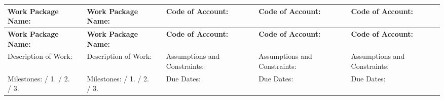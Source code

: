 \documentclass[10pt,letterpaper]{article}
\renewcommand\arraystretch{1.25}
\begin{document}
\begin{landscape}
\begin{center}
\begingroup
\setlength\tabcolsep{2.0pt}
\tiny
\renewcommand\arraystretch{1.55}
\begin{longtable}{|>{\raggedright\arraybackslash}p{0.795in}|>{\raggedright\arraybackslash}p{0.795in}|>{\raggedright\arraybackslash}p{0.795in}|>{\raggedright\arraybackslash}p{0.795in}|>{\raggedright\arraybackslash}p{0.795in}|>{\raggedright\arraybackslash}p{0.795in}|>{\raggedright\arraybackslash}p{0.795in}|>{\raggedright\arraybackslash}p{0.795in}|>{\raggedright\arraybackslash}p{0.795in}|>{\raggedright\arraybackslash}p{0.795in}|}
\hline
\rowcolor{light}
\textbf{Work Package Name:} & \rule{0pt}{11pt}\hspace{0pt} & \textbf{Work Package Name:} & \rule{0pt}{11pt}\hspace{0pt} & \textbf{Code of Account:} & \rule{0pt}{11pt}\hspace{0pt} & \textbf{Code of Account:} & \rule{0pt}{11pt}\hspace{0pt} & \textbf{Code of Account:} & \rule{0pt}{11pt}\hspace{0pt} \\ \hline
\endfirsthead
\hline\rowcolor{light} \textbf{Work Package Name:} & \rule{0pt}{11pt}\hspace{0pt} & \textbf{Work Package Name:} & \rule{0pt}{11pt}\hspace{0pt} & \textbf{Code of Account:} & \rule{0pt}{11pt}\hspace{0pt} & \textbf{Code of Account:} & \rule{0pt}{11pt}\hspace{0pt} & \textbf{Code of Account:} & \rule{0pt}{11pt}\hspace{0pt} \\ \hline
\endhead
Description of Work: & \rule{0pt}{11pt}\hspace{0pt} & Description of Work: & \rule{0pt}{11pt}\hspace{0pt} & Assumptions and Constraints: & \rule{0pt}{11pt}\hspace{0pt} & Assumptions and Constraints: & \rule{0pt}{11pt}\hspace{0pt} & Assumptions and Constraints: & \rule{0pt}{11pt}\hspace{0pt} \\ \hline
Milestones: / 1. / 2. / 3. & \rule{0pt}{11pt}\hspace{0pt} & Milestones: / 1. / 2. / 3. & \rule{0pt}{11pt}\hspace{0pt} & Due Dates: & \rule{0pt}{11pt}\hspace{0pt} & Due Dates: & \rule{0pt}{11pt}\hspace{0pt} & Due Dates: & \rule{0pt}{11pt}\hspace{0pt} \\ \hline

\end{longtable}
\end{center}
\end{landscape}
\end{document}
